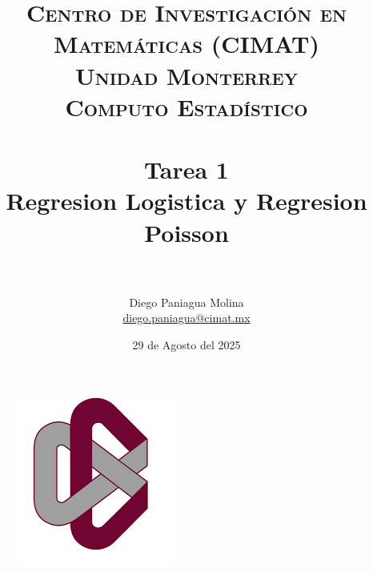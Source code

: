 \documentclass[paper=letter, fontsize=11pt]{article}
\title{	
\normalfont \normalsize 
\textsc{Centro de Investigaci\'on en Matem\'aticas (CIMAT)\\
Unidad Monterrey
\\ [15pt]
\textcolor{CIMATRed}{\textbf{\large{Computo Estadístico}}}} 
\\ [25pt] 
\horrule{0.5pt} \\[0.4cm] %
\huge \textbf{Tarea 1} \\[0.2cm]
\large{Regresion Logistica y Regresion Poisson}\\ 
\horrule{2pt} \\[0.5cm] %
}
\author{\normalsize{Diego Paniagua Molina}\\\normalsize{\href{mailto:diego.paniagua@cimat.mx} {diego.paniagua@cimat.mx}}}
\date{\normalsize{29 de Agosto del 2025}} %
\numberwithin{equation}{section} %
\numberwithin{figure}{section} %
\numberwithin{table}{section} %
\begin{document}
\maketitle %
\thispagestyle{empty}

\begin{figure}[htpb]
  \begin{center}
    \includegraphics[scale=0.6]{images/CIMAT_logo.png}
    \label{fig:hist1}
  \end{center}
\end{figure}

\newpage
{} %

\end{document}
